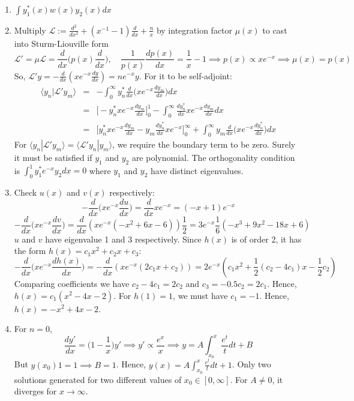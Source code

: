 \documentclass[a4paper]{article}
\begin{document}
\begin{ans}\leavevmode
\begin{enumerate}[label=(\roman*)]
\item $\int y_1^*(x)w(x)y_2(x)dx$
\item Multiply $\mathcal{L}:=\frac{d^2}{dx^2}+(x^{-1}-1)\frac{d}{dx}+\frac{n}{x}$ by integration factor $\mu(x)$ to cast into Sturm-Liouville form $$\mathcal{L}'=\mu\mathcal{L}=\frac{d}{dx}\bigg(p(x)\frac{d}{dx}\bigg),\quad\frac{1}{p(x)}\frac{dp(x)}{dx}=\frac{1}{x}-1\implies p(x)\propto xe^{-x}\implies \mu(x)=p(x)$$
So, $\mathcal{L}'y=-\frac{d}{dx}(xe^{-x}\frac{dy}{dx})=ne^{-x}y$. For it to be self-adjoint:
\begin{eqnarray}
\langle y_n|\mathcal{L}'y_m\rangle&=&-\int_0^\infty y_n^*\frac{d}{dx}\bigg(xe^{-x}\frac{dy_m}{dx}\bigg)dx\nonumber\\&=&\bigg[-y_n^*xe^{-x}\frac{dy_m}{dx}\bigg]_0^1-\int_0^\infty \frac{dy_n^*}{dx}xe^{-x}\frac{dy_m}{dx}dx\nonumber\\&=&\bigg[y_n^*xe^{-x}\frac{dy_m}{dx}-y_m\frac{dy_n^*}{dx}xe^{-x}\bigg]_0^\infty+\int_0^\infty y_m\frac{d}{dx}\bigg(xe^{-x}\frac{dy_n^*}{dx}\bigg)dx\nonumber
\end{eqnarray}
For $\langle y_n|\mathcal{L}'y_m\rangle=\langle\mathcal{L}'y_n|y_m\rangle$, we require the boundary term to be zero. Surely it must be satisfied if $y_1$ and $y_2$ are polynomial. The orthogonality condition is $\int_0^1y_1^*e^{-x}y_2dx=0$ where $y_1$ and $y_2$ have distinct eigenvalues.
\item Check $u(x)$ and $v(x)$ respectively:
$$-\frac{d}{dx}\bigg(xe^{-x}\frac{du}{dx}\bigg)=\frac{d}{dx}xe^{-x}=(-x+1)e^{-x}$$
$$-\frac{d}{dx}\bigg(xe^{-x}\frac{dv}{dx}\bigg)=\frac{d}{dx}(xe^{-x}(-x^2+6x-6))\frac{1}{2}=3e^{-x}\frac{1}{6}(-x^3+9x^2-18x+6)$$
$u$ and $v$ have eigenvalue 1 and 3 respectively. Since $h(x)$ is of order 2, it has the form $h(x)=c_1x^2+c_2x+c_3$:
$$-\frac{d}{dx}\bigg(xe^{-x}\frac{dh(x)}{dx}\bigg)=-\frac{d}{dx}(xe^{-x}(2c_1x+c_2))=2e^{-x}(c_1x^2+\frac{1}{2}(c_2-4c_1)x-\frac{1}{2}c_2)$$
Comparing coefficients we have $c_2-4c_1=2c_2$ and $c_3=-0.5c_2=2c_1$. Hence, $h(x)=c_1(x^2-4x-2)$. For $h(1)=1$, we must have $c_1=-1$. Hence, $h(x)=-x^2+4x-2$.
\item For $n=0$,
$$\frac{dy'}{dx}=\bigg(1-\frac{1}{x}\bigg)y'\implies y'\propto \frac{e^x}{x}\implies y=A\int_{x_0}^x\frac{e^t}{t}dt+B$$
But $y(x_0)1=1\implies B=1$. Hence, $y(x)=A\int_{x_0}^x\frac{e^t}{t}dt+1$. Only two solutions generated for two different values of $x_0\in[0,\infty]$. For $A\neq 0$, it diverges for $x\rightarrow\infty$.
\end{enumerate}
\end{ans}
\end{document}
